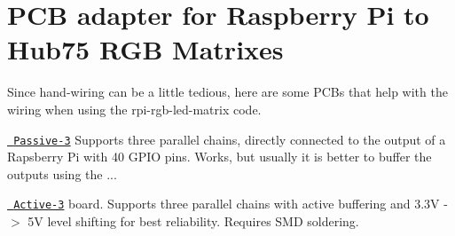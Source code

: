 \chapter{PCB adapter for Raspberry Pi to Hub75 RGB Matrixes}
\hypertarget{md_matrix_2adapter_2README}{}\label{md_matrix_2adapter_2README}
Since hand-\/wiring can be a little tedious, here are some PCBs that help with the wiring when using the {\ttfamily rpi-\/rgb-\/led-\/matrix} code.




\begin{DoxyItemize}
\item \href{./passive-3}{\texttt{ Passive-\/3}} Supports three parallel chains, directly connected to the output of a Rapsberry Pi with 40 GPIO pins. Works, but usually it is better to buffer the outputs using the ...
\item \href{./active-3}{\texttt{ Active-\/3}} board. Supports three parallel chains with active buffering and 3.\+3V -\/\texorpdfstring{$>$}{>} 5V level shifting for best reliability. Requires SMD soldering.


\end{DoxyItemize}
